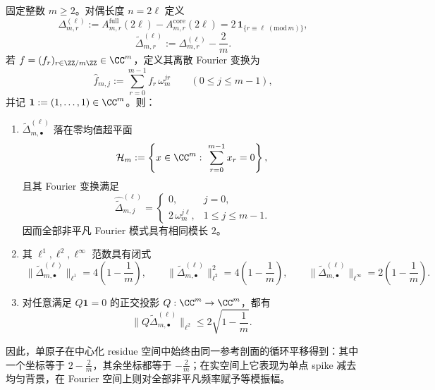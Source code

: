 \begin{theorem}\label{thm:conclusion-realinput40-centered-residue-fourier-rigidity}
固定整数 \(m\ge 2\)。对偶长度 \(n=2\ell\) 定义
\[
\Delta_{m,r}^{(\ell)}
:=
A_{m,r}^{\mathrm{full}}(2\ell)-A_{m,r}^{\mathrm{core}}(2\ell)
=
2\,\mathbf 1_{\{r\equiv \ell\;(\mathrm{mod}\,m)\}},
\]
\[
\widetilde\Delta_{m,r}^{(\ell)}
:=
\Delta_{m,r}^{(\ell)}-\frac{2}{m}.
\]
若 \(f=(f_r)_{r\in\ZZ/m\ZZ}\in\CC^m\)，定义其离散 Fourier 变换为
\[
\widehat f_{m,j}:=\sum_{r=0}^{m-1}f_r\,\omega_m^{jr}
\qquad(0\le j\le m-1),
\]
并记 \(\mathbf 1:=(1,\dots,1)\in\CC^m\)。则：
\begin{enumerate}
  \item \(\widetilde\Delta_{m,\bullet}^{(\ell)}\) 落在零均值超平面
  \[
  \mathcal H_m:=\left\{x\in\CC^m:\ \sum_{r=0}^{m-1}x_r=0\right\},
  \]
  且其 Fourier 变换满足
  \[
  \boxed{\;
  \widehat{\widetilde\Delta}_{m,j}^{(\ell)}
  =
  \begin{cases}
  0,& j=0,\\
  2\,\omega_m^{j\ell},& 1\le j\le m-1.
  \end{cases}}
  \]
  因而全部非平凡 Fourier 模式具有相同模长 \(2\)。
  \item 其 \(\ell^1,\ell^2,\ell^\infty\) 范数具有闭式
  \[
  \boxed{\;
  \bigl\|\widetilde\Delta_{m,\bullet}^{(\ell)}\bigr\|_{\ell^1}
  =
  4\left(1-\frac1m\right),\qquad
  \bigl\|\widetilde\Delta_{m,\bullet}^{(\ell)}\bigr\|_{\ell^2}^2
  =
  4\left(1-\frac1m\right),\qquad
  \bigl\|\widetilde\Delta_{m,\bullet}^{(\ell)}\bigr\|_{\ell^\infty}
  =
  2\left(1-\frac1m\right).\;}
  \]
  \item 对任意满足 \(Q\mathbf 1=0\) 的正交投影 \(Q:\CC^m\to\CC^m\)，都有
  \[
  \boxed{\;
  \bigl\|Q\widetilde\Delta_{m,\bullet}^{(\ell)}\bigr\|_{\ell^2}
  \le
  2\sqrt{1-\frac1m}.\;}
  \]
\end{enumerate}
因此，单原子在中心化 residue 空间中始终由同一参考剖面的循环平移得到：其中一个坐标等于 \(2-\frac{2}{m}\)，其余坐标都等于 \(-\frac{2}{m}\)；在实空间上它表现为单点 spike 减去均匀背景，在 Fourier 空间上则对全部非平凡频率赋予等模振幅。
\end{theorem}
